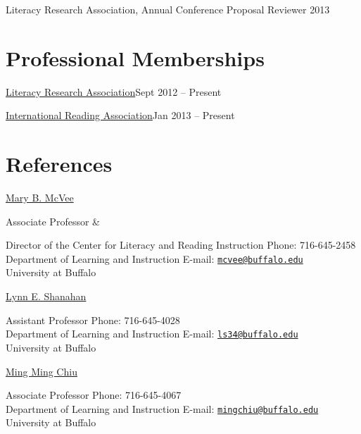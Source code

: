 \begin{innerlist}
    \item Literacy Research Association, Annual Conference Proposal Reviewer \hfill {2013}
\end{innerlist}



\section{Professional Memberships}
\begin{innerlist}
    \item \href{http://www.literacyresearchassociation.org/}{Literacy Research Association}\hfill {Sept 2012 -- Present}
    \item \href{http://www.reading.org/}{International Reading Association}\hfill {Jan 2013 -- Present}
\end{innerlist}


\section{References}
\href{http://gse.buffalo.edu/about/directory/faculty/2039}{Mary B. McVee}
\begin{innerlist}
\item[] Associate Professor \&
\item[] Director of the Center for Literacy and Reading Instruction \hfill {Phone: 716-645-2458}\\
Department of Learning and Instruction \hfill{E-mail: \href{mailto:mcvee@buffalo.edu}{\nolinkurl{mcvee@buffalo.edu}}}\\
University at Buffalo
\end{innerlist}

\href{http://gse.buffalo.edu/about/directory/faculty/2110}{Lynn E. Shanahan}
\begin{innerlist}
\item[] Assistant Professor \hfill {Phone: 716-645-4028}\\
Department of Learning and Instruction \hfill{E-mail: \href{mailto:ls34@buffalo.edu}{\nolinkurl{ls34@buffalo.edu}}}\\
University at Buffalo
\end{innerlist}

\href{http://gse.buffalo.edu/about/directory/faculty/2135}{Ming Ming Chiu}
\begin{innerlist}
\item[] Associate Professor \hfill {Phone: 716-645-4067}\\
Department of Learning and Instruction \hfill{E-mail: \href{mailto:mingchiu@buffalo.edu}{\nolinkurl{mingchiu@buffalo.edu}}}\\
University at Buffalo
\end{innerlist}

